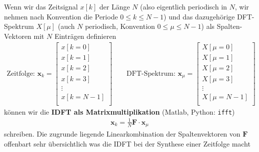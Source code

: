 Wenn wir das Zeitsignal $x[k]$ der Länge $N$ (also eigentlich periodisch in $N$,
wir nehmen nach Konvention die Periode $0 \leq k \leq N-1$)
und das dazugehörige DFT-Spektrum $X[\mu]$ (auch $N$ periodisch,
Konvention $0\leq \mu \leq N-1$)
als Spalten-Vektoren mit $N$ Einträgen definieren
\begin{align}
\text{Zeitfolge: }
\bm{x}_k =
\begin{bmatrix}
x[k=0]\\
x[k=1]\\
x[k=2]\\
x[k=3]\\
\vdots\\
x[k=N-1]\\
\end{bmatrix}\qquad
\text{DFT-Spektrum: }
\bm{x}_\mu =
\begin{bmatrix}
X[\mu=0]\\
X[\mu=1]\\
X[\mu=2]\\
X[\mu=3]\\
\vdots\\
X[\mu=N-1]\\
\end{bmatrix}
\end{align}
können wir die \textbf{IDFT als Matrixmultiplikation} (Matlab, Python: \texttt{ifft})
\begin{align}
\bm{x}_k = \frac{1}{N} \bm{F} \cdot \bm{x}_\mu
\end{align}
schreiben.
Die zugrunde liegende Linearkombination der Spaltenvektoren von $\bm{F}$
offenbart sehr übersichtlich was die IDFT bei der Synthese einer Zeitfolge macht
\label{LinComb_for_IDFT}
%
